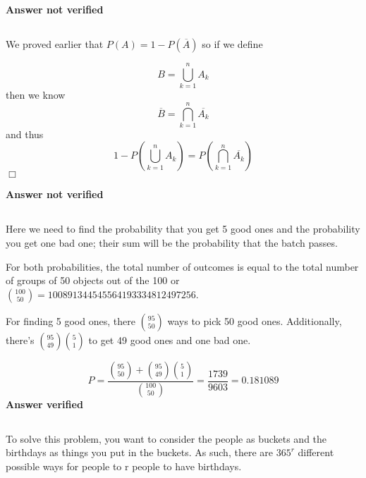 \textbf{Answer not verified}


\subsection{}
We proved earlier that $P(A) = 1 - P(\overline{A})$ so if we define

\begin{equation}
	B = \bigcup_{k=1}^n A_k
\end{equation}
then we know
\begin{equation}
	\overline{B} = \bigcap_{k=1}^n \overline{A_k}
\end{equation}
and thus
\begin{equation}
	1 - P\left(\bigcup_{k=1}^n A_k\right)  =P\left( \bigcap_{k=1}^n \overline{A_k} \right)
\end{equation}
$\Box$

\textbf{Answer not verified}

\subsection{}

Here we need to find the probability that you get 5 good ones and the probability you get one bad one; their sum will be the probability that the batch passes.

For both probabilities, the total number of outcomes is equal to the total number of groups of 50 objects out of the 100 or $\binom{100}{50} = 100891344545564193334812497256$.

For finding 5 good ones, there $\binom{95}{50}$ ways to pick 50 good ones.  Additionally, there's $\binom{95}{49}\binom{5}{1}$ to get 49 good ones and one bad one.

\begin{equation}
	P = \frac{\binom{95}{50}+\binom{95}{49}\binom{5}{1}}{\binom{100}{50}} = \frac{1739}{9603} = 0.181089
\label{answer2.13}
\end{equation}
\textbf{Answer verified}

\subsection{}

To solve this problem, you want to consider the people as buckets and the birthdays as things you put in the buckets.  As such, there are $365^r$ different possible ways for people to r people to have birthdays.  

